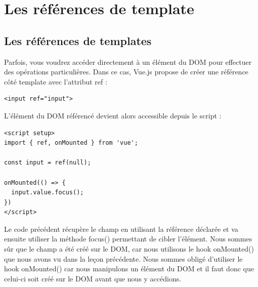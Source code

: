 \documentclass{article}
\begin{document}


\section{Les références de template}
\subsection{Les références de {\color{monOrange}templates}}
Parfois, vous voudrez accéder directement à un élément du DOM pour effectuer des opérations particulières. Dans ce cas, {\color{monOrange}Vue.js} propose de créer une référence côté {\color{monOrange}template} avec l'attribut {\color{monOrange}ref }:
\begin{verbatim}
<input ref="input">
\end{verbatim}
L'élément du DOM référencé devient alors accessible depuis le {\color{monOrange}script} :
\begin{verbatim}
<script setup>
import { ref, onMounted } from 'vue';

const input = ref(null);

onMounted(() => {
  input.value.focus();
})
</script>
\end{verbatim}
Le code précédent récupère le champ en utilisant la référence déclarée et va ensuite utiliser la méthode {\color{monOrange}focus()} permettant de cibler l'élément. Nous sommes sûr que le champ a été créé sur le DOM, car nous utilisons le {\color{monOrange}hook onMounted()} que nous avons vu dans la leçon précédente. Nous sommes obligé d'utiliser le {\color{monOrange}hook onMounted()} car nous manipulons un élément du DOM et il faut donc que celui-ci soit créé sur le DOM avant que nous y accédions.
\end{document}
